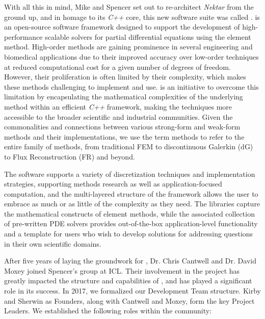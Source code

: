 With all this in mind, Mike and Spencer set out to re-architect \emph{Nektar} from the ground up, and in homage
to its {\em C++} core, this new software suite was called \nek{}.  \nek{} 
is an open-source software framework designed to support the development
of high-performance scalable solvers for partial differential equations using
the \shp{} element method. High-order methods are gaining prominence in
several engineering and biomedical applications due to their improved accuracy
over low-order techniques at reduced computational cost for a given number of degrees of freedom. However,
their proliferation is often limited by their complexity, which makes
these methods challenging to implement and use. \nek{} is an initiative to
overcome this limitation by encapsulating the mathematical complexities of the underlying method within an
efficient {\em C++} framework, making the techniques more accessible to the broader 
scientific and industrial communities.  Given the commonalities and connections between various strong-form
and weak-form methods and their implementations, we use the term \shp methods to refer to the entire family of
methods, from traditional FEM to discontinuous Galerkin (dG) to Flux Reconstruction (FR) and beyond.

The software supports a variety of discretization techniques and implementation
strategies, supporting methods research as well as application-focused
computation, and the multi-layered structure of the framework allows the user to
embrace as much or as little of the complexity as they need. The
libraries capture the mathematical constructs of \shp{} element methods,
while the associated collection of pre-written PDE solvers provides
out-of-the-box application-level functionality and a template for users who wish to develop
solutions for addressing questions in their own scientific domains.

After five years of laying the groundwork for \nek{}, Dr. Chris Cantwell and Dr. David Moxey joined
Spencer's group at ICL.  Their involvement in the project has greatly impacted the structure and
capabilities of \nek{}, and has played a significant role in its success.  In 2017, we formalized
our Development Team structure.  Kirby and Sherwin as Founders, along with Cantwell and Moxey,
form the key Project Leaders. We established the following roles within the \nek{} community:

